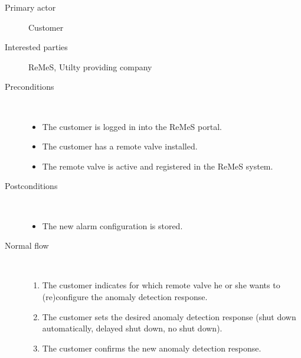 \begin{description}
	\item[Primary actor] Customer
	\item[Interested parties] ReMeS, Utilty providing company
	\item[Preconditions] \ 
	\begin{itemize}
		\item The customer is logged in into the ReMeS portal.
		\item The customer has a remote valve installed.
		\item The remote valve is active and registered in the ReMeS system.
	\end{itemize}
	\item[Postconditions] \ 
	\begin{itemize}
		\item The new alarm configuration is stored.
	\end{itemize}
	\item[Normal flow] \ 
	\begin{enumerate}
	  	\item The customer indicates for which remote valve he or she wants to
	  	(re)configure the anomaly detection response.
	  	\item The customer sets the desired anomaly detection response (shut down
	  	automatically, delayed shut down, no shut down).
	  	\item The customer confirms the new anomaly detection response.
	\end{enumerate}
\end{description}
